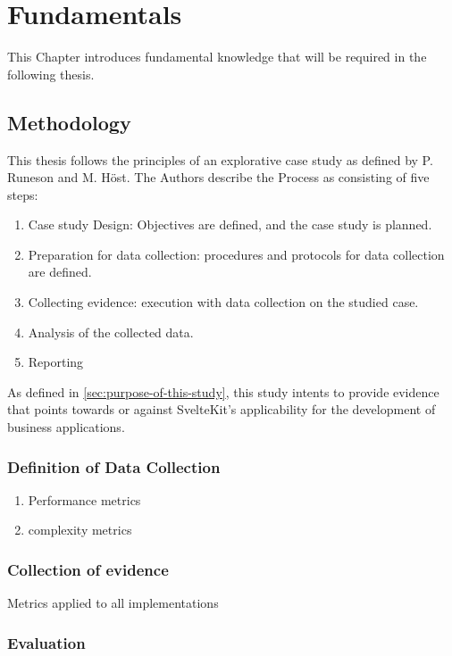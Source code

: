 
\chapter{Fundamentals}
\label{ch:fundamentals}

This Chapter introduces fundamental knowledge that will be required in the following thesis.


\section{Methodology}
\label{sec:methodology}

This thesis follows the principles of an explorative case study as defined by P. Runeson and M. Höst\cite{runeson_guidelines_2009}. The Authors describe the Process as consisting of five steps:

\begin{enumerate}
    \item Case study Design: Objectives are defined, and the case study is planned.
    \item Preparation for data collection: procedures and protocols for data collection are defined.
    \item Collecting evidence: execution with data collection on the studied case.
    \item Analysis of the collected data.
    \item Reporting
\end{enumerate}

As defined in \ref{sec:purpose-of-this-study}, this study intents to provide evidence that points towards or against SvelteKit's applicability for the development of business applications.

\subsection{Definition of Data Collection}
\begin{enumerate}
    \item Performance metrics
    \item complexity metrics
\end{enumerate}

\subsection{Collection of evidence}

Metrics applied to all implementations


\subsection{Evaluation}

